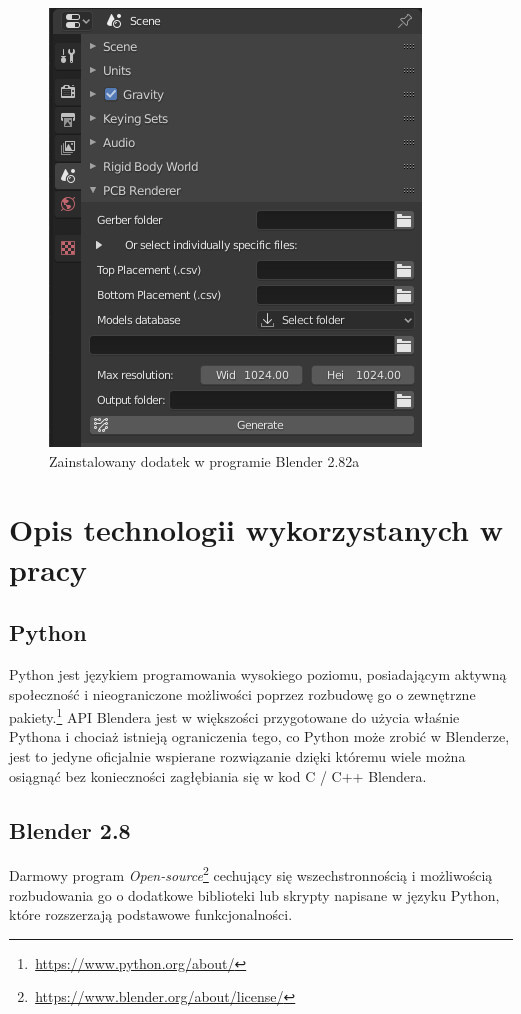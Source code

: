 \documentclass[brudnopis]{xmgr}
\begin{document}
\begin{figure}
\centering
\includegraphics[width=0.75\hsize]{fig/addon_1}
\caption{Zainstalowany dodatek w programie Blender 2.82a}
\end{figure}

\section {Opis technologii wykorzystanych w pracy}

\subsection{Python}
Python jest językiem programowania wysokiego poziomu, posiadającym aktywną społeczność i nieograniczone możliwości poprzez rozbudowę go o zewnętrzne pakiety.\footnote {\,\url{https://www.python.org/about/}} API Blendera jest w większości przygotowane do użycia właśnie Pythona i chociaż istnieją ograniczenia tego, co Python może zrobić w Blenderze, jest to jedyne oficjalnie wspierane rozwiązanie dzięki któremu wiele można osiągnąć bez konieczności zagłębiania się w kod C / C++ Blendera.

\subsection {Blender 2.8}
Darmowy program \emph{Open-source}\footnote{\,\url{https://www.blender.org/about/license/}} cechujący się wszechstronnością i możliwością rozbudowania go o dodatkowe biblioteki lub skrypty napisane w języku Python, które rozszerzają podstawowe funkcjonalności.
\end{document}
